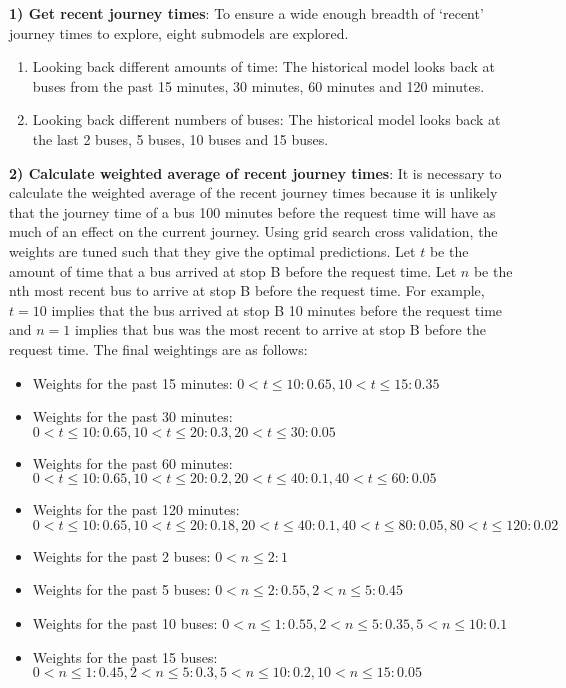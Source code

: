 \textbf{1) Get recent journey times}: To ensure a wide enough breadth of `recent' journey times to explore, eight submodels are explored.

\begin{enumerate}[label=(\alph*)]

\item Looking back different amounts of time: The historical model looks back at buses from the past 15 minutes, 30 minutes, 60 minutes and 120 minutes. 

\item Looking back different numbers of buses: The historical model looks back at the last 2 buses, 5 buses, 10 buses and 15 buses.

\end{enumerate} 

\textbf{2) Calculate weighted average of recent journey times}: It is necessary to calculate the weighted average of the recent journey times because it is unlikely that the journey time of a bus 100 minutes before the request time will have as much of an effect on the current journey. Using grid search cross validation, the weights are tuned such that they give the optimal predictions. Let $t$ be the amount of time that a bus arrived at stop B before the request time. Let $n$ be the nth most recent bus to arrive at stop B before the request time. For example, $t = 10$ implies that the bus arrived at stop B 10 minutes before the request time and $n=1$ implies that bus was the most recent to arrive at stop B before the request time. The final weightings are as follows:

\begin{itemize}
    \item Weights for the past 15 minutes: $0 < t \leq 10: 0.65, 10 < t \leq 15: 0.35$
    \item Weights for the past 30 minutes: $0 < t \leq 10: 0.65, 10 < t \leq 20: 0.3, 20 < t \leq 30: 0.05$ 
    \item Weights for the past 60 minutes: $0 < t \leq 10: 0.65, 10 < t \leq 20: 0.2, 20 < t \leq 40: 0.1, 40 < t \leq 60: 0.05$ 
    \item Weights for the past 120 minutes:$0 < t \leq 10: 0.65, 10 < t \leq 20: 0.18, 20 < t \leq 40: 0.1, 40 < t \leq 80: 0.05, 80 < t \leq 120: 0.02$ 
    \item Weights for the past 2 buses: $0 < n \leq 2: 1$
    \item Weights for the past 5 buses: $0 < n \leq 2: 0.55, 2 < n \leq 5: 0.45$
    \item Weights for the past 10 buses: $0 < n \leq 1: 0.55, 2 < n \leq 5: 0.35, 5 < n \leq 10: 0.1$
    \item Weights for the past 15 buses: $0 < n \leq 1: 0.45, 2 < n \leq 5: 0.3, 5 < n \leq 10: 0.2, 10 < n \leq 15: 0.05$
\end{itemize}


